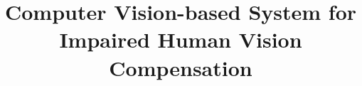 \documentclass[10pt,conference,compsocconf]{IEEEtran}
\begin{document}
%
\title{\textbf{\Large Computer Vision-based System for Impaired Human Vision Compensation}} %



% 
\end{document}
